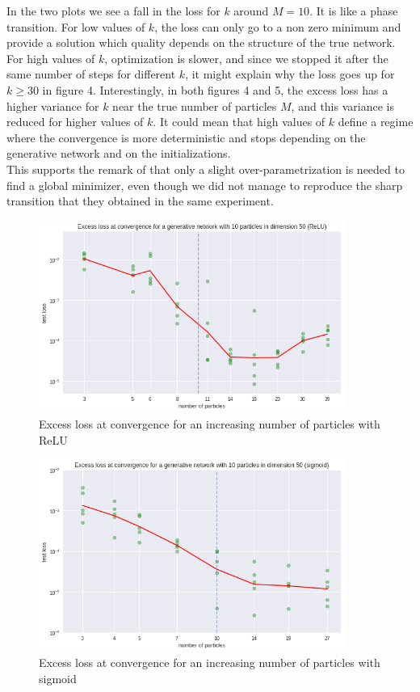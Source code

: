 \documentclass[a4paper, 11pt]{scrartcl}
\begin{document}
{In the two plots we see a fall in the loss for $k$ around $M=10$. It is like a phase transition. For low values of $k$, the loss can only go to a non zero minimum and provide a solution which quality depends on the structure of the true network. For high values of $k$, optimization is slower, and since we stopped it after the same number of steps for different $k$, it might explain why the loss goes up for $k \geq 30$ in figure 4. Interestingly, in both figures 4 and 5, the excess loss has a higher variance for $k$ near the true number of particles $M$, and this variance is reduced for higher values of $k$. It could mean that high values of $k$ define a regime where the convergence is more deterministic and stops depending on the generative network and on the initializations.\\

This supports the remark of \cite{chizat2018global} that only a slight over-parametrization is needed to find a global minimizer, even though we did not manage to reproduce the sharp transition that they obtained in the same experiment.




\begin{figure}[H]
\centering
\includegraphics[width=10cm]{lossr.png}
  \caption{Excess loss at convergence for an increasing number of particles with ReLU}
  \label{fig:3}
\end{figure}

\begin{figure}[H]
\centering
\includegraphics[width=10cm]{loss.png}
  \caption{Excess loss at convergence for an increasing number of particles with sigmoid}
  \label{fig:3}
\end{figure}


}
\end{document}

